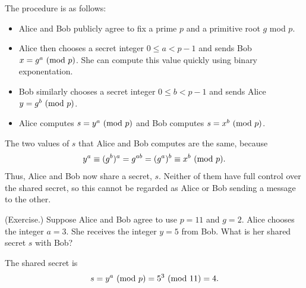 \documentclass[letterpaper]{article}
\begin{document}
The procedure is as follows:
\begin{itemize}
    \item Alice and Bob publicly agree to fix a prime $p$ and a primitive root $g$ mod $p$. 
    \item Alice then chooses a secret integer $0 \leq a < p - 1$ and sends Bob $x = g^a \ (\mathrm{mod}\ p)$. She can compute this value quickly using binary exponentation. 
    \item Bob similarly chooses a secret integer $0 \leq b < p - 1$ and sends Alice $y = g^b \ (\mathrm{mod}\ p)$. 
    \item Alice computes $s = y^a \ (\mathrm{mod}\ p)$ and Bob computes $s = x^b \ (\mathrm{mod}\ p)$.  
\end{itemize}
The two values of $s$ that Alice and Bob computes are the same, because
\[y^a \equiv (g^b)^a = g^{ab} = (g^a)^b \equiv x^b \ (\mathrm{mod}\ p).\]
Thus, Alice and Bob now share a secret, $s$. Neither of them have full control over the shared secret, so this cannot be regarded as Alice or Bob sending a message to the other.
\begin{mdframed}
    (Exercise.) Suppose Alice and Bob agree to use $p = 11$ and $g = 2$. Alice chooses the integer $a = 3$. She receives the integer $y = 5$ from Bob. What is her shared secret $s$ with Bob? 

    \begin{mdframed}
        The shared secret is \[s = y^a \ (\mathrm{mod}\ p) = 5^3 \ (\mathrm{mod}\ 11) = 4.\]
    \end{mdframed}
\end{mdframed}
\end{document}
